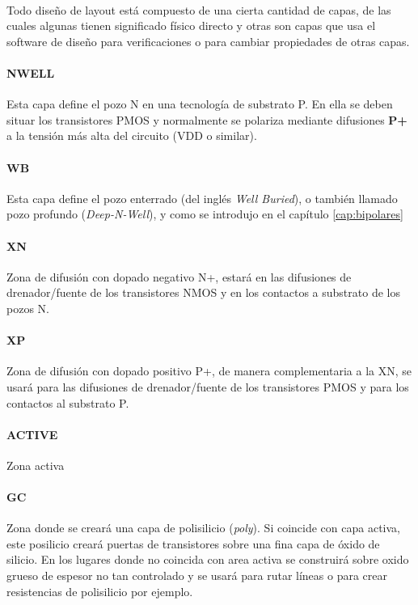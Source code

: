 \paragraph{}
Todo diseño de layout está compuesto de una cierta cantidad de capas, de las cuales
algunas tienen significado físico directo y otras son capas que usa el software de
diseño para verificaciones o para cambiar propiedades de otras capas.

\paragraph{NWELL}
Esta capa define el pozo N en una tecnología de substrato P. En ella se deben
situar los transistores PMOS y normalmente se polariza mediante difusiones \textbf{P+}
a la tensión más alta del circuito (VDD o similar).

\paragraph{WB}
Esta capa define el pozo enterrado (del inglés \textit{Well Buried}), o también
llamado pozo profundo (\textit{Deep-N-Well}), y como se introdujo en el capítulo
\ref{cap:bipolares}

\paragraph{XN}
Zona de difusión con dopado negativo N+, estará en las difusiones de drenador/fuente
de los transistores NMOS y en los contactos a substrato de los pozos N.

\paragraph{XP}
Zona de difusión con dopado positivo P+, de manera complementaria a la XN,
se usará para las difusiones de drenador/fuente
de los transistores PMOS y para los contactos al substrato P.

\paragraph{ACTIVE}
Zona activa

\paragraph{GC}
Zona donde se creará una capa de polisilicio (\textit{poly}). Si coincide con capa activa,
este posilicio creará puertas de transistores sobre una fina capa de óxido de silicio.
En los lugares donde no coincida con area activa se construirá sobre oxido grueso
de espesor no tan controlado y se usará para rutar líneas o para crear resistencias
de polisilicio por ejemplo.

